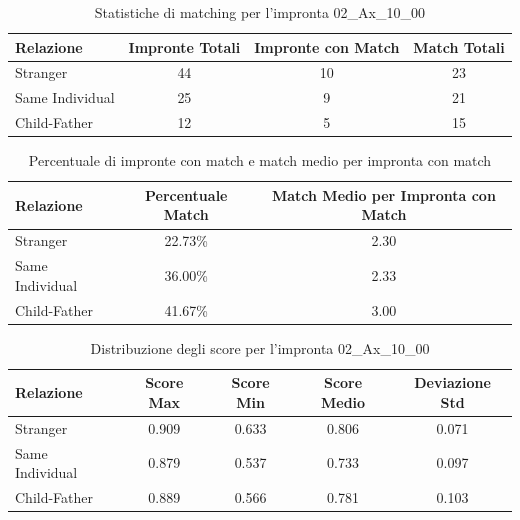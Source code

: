 \begin{table}[htbp]
\centering
\caption{Statistiche di matching per l'impronta 02\_Ax\_10\_00}
\label{tab:results_02_Ax_10_00}
\begin{tabular}{|l|c|c|c|}
\hline
\textbf{Relazione} & \textbf{Impronte Totali} & \textbf{Impronte con Match} & \textbf{Match Totali} \\
\hline
Stranger & 44 & 10 & 23 \\
\hline
Same Individual & 25 & 9 & 21 \\
\hline
Child-Father & 12 & 5 & 15 \\
\hline
\end{tabular}
\end{table}


\begin{table}[htbp]
\centering
\caption{Percentuale di impronte con match e match medio per impronta con match}
\label{tab:match_percentage_02_Ax_10_00}
\begin{tabular}{|l|c|c|}
\hline
\textbf{Relazione} & \textbf{Percentuale Match} & \textbf{Match Medio per Impronta con Match} \\
\hline
Stranger & 22.73\% & 2.30 \\
\hline
Same Individual & 36.00\% & 2.33 \\
\hline
Child-Father & 41.67\% & 3.00 \\
\hline
\end{tabular}
\end{table}


\begin{table}[htbp]
\centering
\caption{Distribuzione degli score per l'impronta 02\_Ax\_10\_00}
\label{tab:scores_02_Ax_10_00}
\begin{tabular}{|l|c|c|c|c|}
\hline
\textbf{Relazione} & \textbf{Score Max} & \textbf{Score Min} & \textbf{Score Medio} & \textbf{Deviazione Std} \\
\hline
Stranger & 0.909 & 0.633 & 0.806 & 0.071 \\
\hline
Same Individual & 0.879 & 0.537 & 0.733 & 0.097 \\
\hline
Child-Father & 0.889 & 0.566 & 0.781 & 0.103 \\
\hline
\end{tabular}
\end{table}

